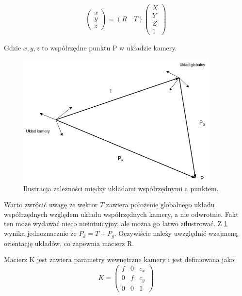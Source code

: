 \documentclass[oneside, eng]{mgr}
\begin{document}
\begin{align*}
	\left( \begin{array}{l} x \\ y \\ z \end{array} \right) =
	(R \quad T)
	\left( \begin{array}{l}
		X \\	Y \\	Z \\	1
	\end{array} \right) 
\end{align*}

Gdzie $x, y, z$ to współrzędne punktu P w układzie kamery.


\begin{figure}
\centering
	\includegraphics[width=0.90\textwidth]{pinhole.jpg}\par\vspace{1cm}
\caption{Ilustracja zależności między układami współrzędnymi a punktem.}
	\label{fig:camera_coordinate_systems}
\end{figure}

Warto zwrócić uwagę że wektor $T$ zawiera położenie globalnego układu współrzędnych względem układu współrzędnych kamery, a nie odwrotnie. Fakt ten może wydawać nieco nieintuicyjny, ale można go łatwo zilustrować. Z \ref{fig:camera_coordinate_systems} wynika jednoznacznie że $P_k = T + P_g$. Oczywiście należy uwzględnić wzajmeną orientację układów, co zapewnia macierz R.

Macierz K jest zawiera parametry wewnętrzne kamery i jest definiowana jako:
\begin{equation}
	K = \left( \begin{array}{lll}
		f & 0 & c_x \\
		0 & f & c_y \\
		0 & 0 & 1
	\end{array} \right)
\end{equation}
\end{document}
